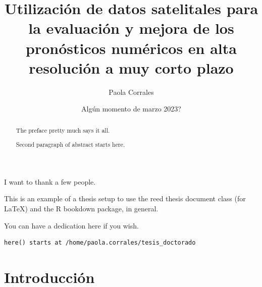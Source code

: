 \documentclass[12pt,twoside]{reedthesis}
\title{Utilización de datos satelitales para la evaluación y mejora de los pronósticos numéricos en alta resolución a muy corto plazo}
\author{Paola Corrales}
\date{Algún momento de marzo 2023?}
\newenvironment{Shaded}{\begin{snugshade}}{\end{snugshade}}
\newcommand{\DataTypeTok}[1]{\textcolor[rgb]{0.13,0.29,0.53}{#1}}
\newcommand{\KeywordTok}[1]{\textcolor[rgb]{0.13,0.29,0.53}{\textbf{#1}}}
\newcommand{\NormalTok}[1]{#1}
\newcommand{\OperatorTok}[1]{\textcolor[rgb]{0.81,0.36,0.00}{\textbf{#1}}}
\newcommand{\OtherTok}[1]{\textcolor[rgb]{0.56,0.35,0.01}{#1}}
\begin{document}
  \maketitle

\frontmatter %
\pagestyle{empty} %
  \begin{acknowledgements}
    I want to thank a few people.
  \end{acknowledgements}
  \begin{preface}
    This is an example of a thesis setup to use the reed thesis document class
    (for LaTeX) and the R bookdown package, in general.
  \end{preface}
  \hypersetup{linkcolor=black}
  \setcounter{secnumdepth}{2}
  \setcounter{tocdepth}{2}
  \tableofcontents

  \listoftables

  \listoffigures
  \begin{abstract}
    The preface pretty much says it all.
    
    \par
    
    Second paragraph of abstract starts here.
  \end{abstract}
  \begin{dedication}
    You can have a dedication here if you wish.
  \end{dedication}
\mainmatter %
\pagestyle{fancyplain} %
\begin{Shaded}
\end{Shaded}
\begin{verbatim}
here() starts at /home/paola.corrales/tesis_doctorado
\end{verbatim}
\hypertarget{introducciuxf3n}{%
\chapter*{Introducción}\label{introducciuxf3n}}
\end{document}
